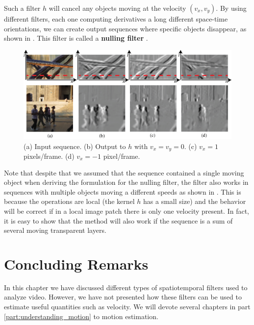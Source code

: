 %


Such a filter $h$ will cancel any objects moving at the velocity $(v_x,v_y)$. By using different filters, each one computing derivatives a long different space-time orientations, we can create output sequences where specific objects disappear, as shown in \fig{\ref{fig:tunedfilter}}. This filter is called a {\bf nulling filter} \cite{Darrell93}.

\begin{figure}
\includegraphics[width=1\linewidth]{figures/temporal_filters/seq_filtered_der.eps}
\caption{(a) Input sequence. (b) Output to $h$ with $v_x=v_y=0$. (c) $v_x=1$ pixels/frame. (d) $v_x=-1$ pixel/frame.} 
\label{fig:tunedfilter}
\end{figure}


Note that despite that we assumed that the sequence contained a single moving object when deriving the formulation for the nulling filter, the filter also works in sequences with multiple objects moving a different speeds as shown in \fig{\ref{fig:tunedfilter}}. This is because the operations are local (the kernel $h$ has a small size) and the behavior will be correct if in a local image patch there is only one velocity present. In fact, it is easy to show that the method will also work if the sequence is a sum of several moving transparent layers. 


\section{Concluding Remarks}

In this chapter we have discussed different types of spatiotemporal filters used to analyze video. However, we have not presented how these filters can be used to estimate useful quantities such as velocity. We will devote several chapters in part \ref{part:understanding_motion} to motion estimation. 

